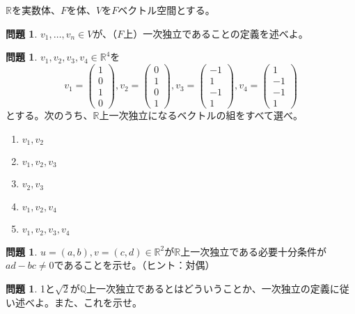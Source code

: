 \documentclass[uplatex]{jsarticle}
\theoremstyle{definition}
\numberwithin{equation}{section}
\newtheorem{prob}[section]{問題}
\newcommand{\R}{\mathbb{R}}
\newcommand{\Q}{\mathbb{Q}}
\begin{document}
$\R$を実数体、$F$を体、$V$を$F$ベクトル空間とする。
\begin{prob}
  $v_1,\dots,v_n \in V$が、（$F$上）一次独立であることの定義を述べよ。
\end{prob}

\begin{prob}
  $v_1,v_2,v_3,v_4\in \R^4$を
  \[
    v_1 = \begin{pmatrix}
      1 \\ 0 \\ 1 \\ 0
    \end{pmatrix}
    , v_2 = \begin{pmatrix}
      0 \\ 1 \\ 0 \\ 1
    \end{pmatrix}
    , v_3 = \begin{pmatrix}
      -1\\ 1 \\ -1 \\ 1
    \end{pmatrix}
    , v_4 = \begin{pmatrix}
      1 \\ -1 \\ -1 \\ 1
    \end{pmatrix}
  \]
  とする。次のうち、$\R$上一次独立になるベクトルの組をすべて選べ。
  \begin{enumerate}
    \item $v_1,v_2$
    \item $v_1,v_2,v_3$
    \item $v_2,v_3$
    \item $v_1,v_2,v_4$
    \item $v_1,v_2,v_3,v_4$
  \end{enumerate}
\end{prob}

\begin{prob}
  $u=(a,b), v=(c,d)\in \R^2$が$\R$上一次独立である必要十分条件が$ad-bc \not=0$であることを示せ。（ヒント：対偶）
\end{prob}

\begin{prob}
  1と$\sqrt{2}$が$\Q$上一次独立であるとはどういうことか、一次独立の定義に従い述べよ。また、これを示せ。
\end{prob}
\end{document}

